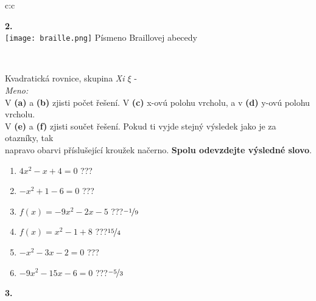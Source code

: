 \documentclass[10pt]{report}
\begin{document}
\begin{tabular}{c:c}
\begin{minipage}[c][99mm][t]{0.49\linewidth}
\begin{center}
\begin{minipage}{0.20\linewidth}
\begin{center}
{\Huge\bfseries 2.} \\[2mm]
\texttt{[image: braille.png]}
{\small Písmeno Braillovej abecedy}
\end{center}
\end{minipage}
\end{center}
\end{minipage}
\\ \hdashline
\begin{minipage}[c][99mm][t]{0.49\linewidth}
\begin{center}
\vspace{7mm}
{\huge Kvadratická rovnice, skupina \textit{Xi $\xi$} -}\\[4.5mm]
\textit{Meno:}\phantom{xxxxxxxxxxxxxxxxxxxxxxxxxxxxxxxxxxxxxxxxxxxxxxxxxxxxxxxxxxxxxxxxx}\\[3.5mm]
V \textbf{(a)} a \textbf{(b)} zjisti počet řešení. V \textbf{(c)} x-ovú polohu vrcholu, a v \textbf{(d)} y-ovú polohu vrcholu.\\V \textbf{(e)} a \textbf{(f)} zjisti součet řešení. Pokud ti vyjde stejný výsledek jako je za otazníky, tak\\napravo obarvi příslušející kroužek načerno. \textbf{Spolu odevzdejte výsledné slovo}.\\[3mm]
\begin{minipage}{0.77\linewidth}
\begin{center}
\begin{varwidth}{\textwidth}
\begin{enumerate}
\large
\item $4x^2-x+4=0$\quad \dotfill\; ???\;\dotfill {}
\item $-x^2+1-6=0$\quad \dotfill\; ???\;\dotfill {}
\item $f(x)=-9x^2-2x-5$\quad \dotfill\; ???\;\dotfill \quad $\nicefrac{-1}{9}$
\item $f(x)=x^2-1+8$\quad \dotfill\; ???\;\dotfill \quad $\nicefrac{15}{4}$
\item $-x^2-3x-2=0$\quad \dotfill\; ???\;\dotfill {}
\item $-9x^2-15x-6=0$\quad \dotfill\; ???\;\dotfill \quad $\nicefrac{-5}{3}$
\end{enumerate}
\end{varwidth}
\end{center}
\end{minipage}
\begin{minipage}{0.20\linewidth}
\begin{center}
{\Huge\bfseries 3.} \\[2mm]

\end{center}
\end{minipage}
\end{center}
\end{minipage}
\end{tabular}
\end{document}
